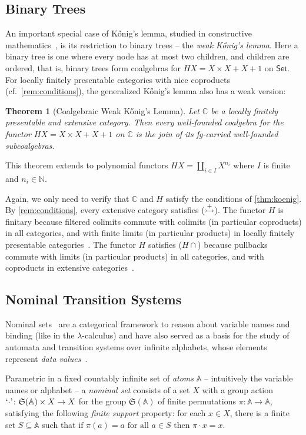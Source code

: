 \documentclass[10pt,a4paper]{article}
\newtheorem{theorem}{Theorem}[section]
\theoremstyle{definition}
\theoremstyle{remark}
\numberwithin{equation}{section}
\providecommand{\catname}{\mathsf}
\def\Set{\catname{Set}}
\newcommand{\Konig}{Kőnig}
\newcommand{\lfplong}{locally finitely presentable\xspace}
\newcommand{\lfp}{\lfplong}
\providecommand{\C}{}
\renewcommand{\C}{{\mathbb{C}}}
\newcommand{\Nat}{\mathds{N}}
\renewcommand{\Nat}{\mathbb{N}}
\newenvironment{proofhere}[2][Proof of]{    \proof{#1~\autoref{#2}}    }{  \endproof  \par}
\newenvironment{proofappendix}[2][Proof of]{    \begin{proofhere}[#1]{#2}\label{#2:proof}
  }{    \end{proofhere}
  }
\newcommand{\injmono}{\ensuremath{\overset{\smash{\raisebox{-1pt}{\ensuremath{\scriptstyle+}}}}{\rightarrowtail}}}\newcommand{\hpresint}{\ensuremath{H\cap}\xspace}
\theoremstyle{plain}
\theoremstyle{definition}
\newcommand{\Perm}{\mathfrak{S}}
\newcommand{\At}{\mathbb{A}}
\begin{document}
\subsection{Binary Trees}
An important special case of \Konig's lemma, studied in constructive mathematics~\cite{di21}, is its restriction to binary trees -- the \emph{weak \Konig's lemma}. Here a {binary} tree is one where every node has at most two children, and children are ordered, that is, binary trees form coalgebras for $HX = X\times X + X + 1$ on $\Set$. For \lfp categories with nice coproducts (cf.~\autoref{rem:conditions}), the generalized \Konig's lemma also has a weak version:

\begin{theorem}[Coalgebraic Weak \Konig's Lemma]\label{cor:weak-koenigs-lemma}
Let $\C$ be a \lfp and extensive category. Then every well-founded coalgebra for the functor $HX = X\times X + X + 1$ on $\C$ is the join of its fg-carried well-founded subcoalgebras.  
\end{theorem}
This theorem extends to polynomial functors $HX = \coprod_{i\in I} X^{n_i}$ where $I$ is finite and $n_i\in \Nat$.

\begin{proofappendix}{cor:weak-koenigs-lemma}
Again, we only need to verify that $\C$ and $H$ satisfy the conditions of \autoref{thm:koenig}. By \autoref{rem:conditions}, every extensive category satisfies (\injmono). The functor $H$ is finitary because filtered colimits commute with colimits (in particular coproducts) in all categories, and with finite limits (in particular products) in \lfp categories~\cite[Prop.~1.59]{adamek_rosicky_1994}. The functor $H$ satisfies (\hpresint) because pullbacks commute with limits (in particular products) in all categories, and with coproducts in extensive categories~\cite[Lem.~1.4]{ls05}.
\end{proofappendix}




\subsection{Nominal Transition Systems}
\label{sec:nom}
Nominal sets~\cite{pitts13} are a categorical framework to reason about variable names and
binding (like in the $\lambda$-calculus) and have also served as a basis for the 
study of automata and transition systems over infinite alphabets, whose elements represent \emph{data values}~\cite{BojanczykEA14}.

Parametric in a fixed countably infinite set of \emph{atoms} $\At$ -- intuitively the variable
names or alphabet -- a \emph{nominal set} consists of a set $X$ with
a group action $\textnormal{`\ensuremath{\cdot}'}\colon \Perm(\At)\times X\to X$
for the group $\Perm(\At)$ of finite permutations $\pi\colon \At\to \At$, satisfying the following
\emph{finite support} property: for each $x\in X$,
there is a finite set $S\subseteq \At$ such that
$
  \text{if }\pi(a) = a \text{ for all }a\in S
  \text{ then }\pi\cdot x = x.
$
\end{document}
